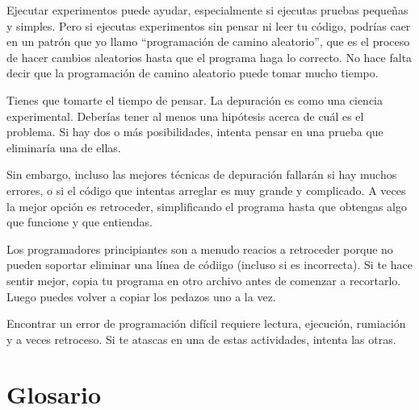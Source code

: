 \documentclass[10pt]{book}
\begin{document}
Ejecutar experimentos puede ayudar, especialmente si ejecutas pruebas
pequeñas y simples.  Pero si ejecutas experimentos sin pensar ni leer tu
código, podrías caer en un patrón que yo llamo ``programación de camino aleatorio'',
que es el proceso de hacer cambios aleatorios hasta que el programa
haga lo correcto.  No hace falta decir que la programación de camino aleatorio
puede tomar mucho tiempo.

Tienes que tomarte el tiempo de pensar.  La depuración es como una
ciencia experimental.  Deberías tener al menos una hipótesis acerca de
cuál es el problema.  Si hay dos o más posibilidades, intenta
pensar en una prueba que eliminaría una de ellas.

Sin embargo, incluso las mejores técnicas de depuración fallarán si hay muchos
errores, o si el código que intentas arreglar es muy grande y
complicado.  A veces la mejor opción es retroceder, simplificando el
programa hasta que obtengas algo que funcione y que
entiendas.

Los programadores principiantes son a menudo reacios a retroceder porque
no pueden soportar eliminar una línea de códiigo (incluso si es incorrecta).
Si te hace sentir mejor, copia tu programa en otro archivo
antes de comenzar a recortarlo.  Luego puedes volver a copiar los
pedazos uno a la vez.

Encontrar un error de programación difícil requiere lectura, ejecución, rumiación y
a veces retroceso.  Si te atascas en una de estas actividades,
intenta las otras.


\section{Glosario}
\end{document}
